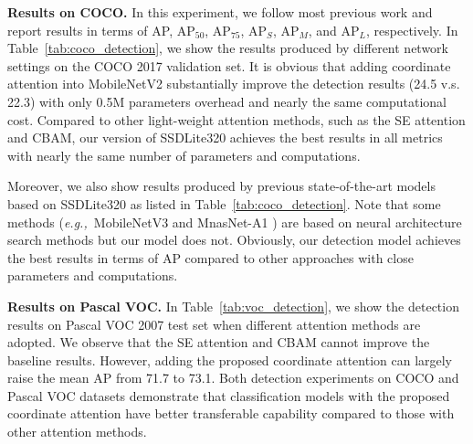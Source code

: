 \documentclass[final]{cvpr}
\def\eg{\emph{e.g.,~}}
\newcommand{\myPara}[1]{\vspace{.05in}\noindent\textbf{#1.}}
\begin{document}
\myPara{Results on COCO}
In this experiment, we follow most previous work
and report results in terms of AP, AP$_{50}$, AP$_{75}$,
AP$_{S}$, AP$_{M}$, and AP$_{L}$, respectively.
%
In Table~\ref{tab:coco_detection}, we show the results 
produced by different network settings 
on the COCO 2017 validation set.
%
It is obvious that adding coordinate attention
into MobileNetV2 substantially improve the detection 
results (24.5 v.s. 22.3) with only 0.5M parameters
overhead and nearly the same computational cost.
%
Compared to other light-weight attention methods,
such as the SE attention and CBAM, 
our version of SSDLite320 achieves the best results 
in all metrics with nearly the same number of
parameters and computations.

Moreover, we also show results produced by
previous state-of-the-art models based on SSDLite320 as listed in
Table~\ref{tab:coco_detection}.
%
Note that some methods (\eg MobileNetV3 \cite{howard2019searching} and MnasNet-A1 \cite{tan2019mnasnet})
are based on neural architecture search methods
but our model does not.
%
Obviously, our detection model achieves the best
results in terms of AP compared to other approaches with close parameters and computations.
%

\myPara{Results on Pascal VOC}
In Table~\ref{tab:voc_detection}, we show the 
detection results on Pascal VOC 2007 test set
when different attention methods are adopted.
%
We observe that the SE attention and CBAM
cannot improve the baseline results.
%
However, adding the proposed coordinate
attention can largely raise the mean AP
from 71.7 to 73.1.
%
Both detection experiments on COCO and
Pascal VOC datasets demonstrate that 
classification models with the proposed 
coordinate attention have better
transferable capability compared to 
those with other attention methods.
\end{document}
